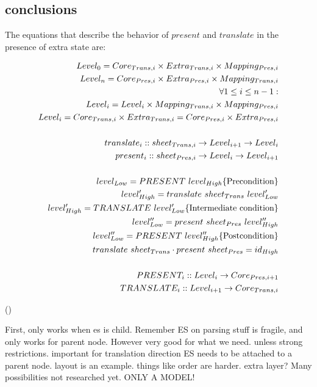 \subsection{conclusions}

The equations that describe the behavior of $present$ and $translate$ in the presence of extra state are:

\begin{small}\begin{align*}%
Level_{0} = Core_{Trans,i} \times Extra_{Trans,i} \times Mapping_{Pres,i}\\
Level_{n} = Core_{Pres,i} \times Extra_{Pres,i} \times Mapping_{Trans,i}\\
\forall 1 \le i \le n-1:  \\
Level_{i} = Level_{i} \times Mapping_{Trans,i} \times Mapping_{Pres,i}\\
Level_{i} = Core_{Trans,i} \times Extra_{Trans,i} = Core_{Pres,i} \times Extra_{Pres,i} \\
\\
translate_{i} :: sheet_{Trans,i} \rightarrow Level_{i+1} \rightarrow Level_{i}\\
present_{i} :: sheet_{Pres,i}  \rightarrow  Level_{i} \rightarrow Level_{i+1}\\
\\
level_{Low} = PRESENT~level_{High}\hfill \text{\{Precondition\}}\\
level'_{High} = translate~sheet_{Trans}~level'_{Low}\\
level'_{High} = TRANSLATE~level'_{Low}\hfill \text{\{Intermediate condition\}}\\
level''_{Low} = present~sheet_{Pres}~level''_{High}\\
level''_{Low} = PRESENT~level''_{High}\hfill \text{\{Postcondition\}}\\
translate~sheet_{Trans}  \cdot present~sheet_{Pres} = id_{High}\\
\\
PRESENT_{i} :: Level_{i} \rightarrow Core_{Pres,i+1}\\
TRANSLATE_{i} :: Level_{i+1} \rightarrow Core_{Trans,i}\\
\end{align*} 
\end{small}
{\centering ()\\}

First, only works when es is child.
Remember ES on parsing stuff is fragile, and only works for parent node. However very good for what we need.
 unless strong restrictions. important for translation direction
ES needs to be attached to a parent node. layout is an example. things like order are harder. extra layer?
Many possibilities not researched yet.
ONLY A MODEL!

